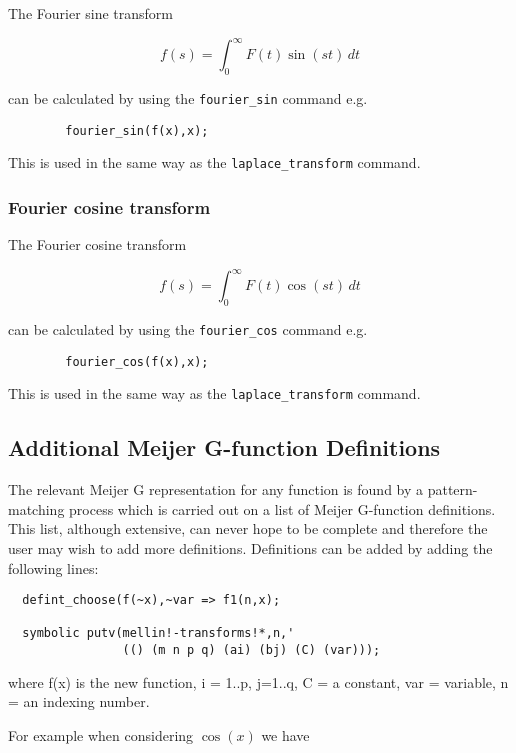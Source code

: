 The Fourier sine transform

\[
f(s) = \int_{0}^{\infty} F(t) \sin(st) \,dt
\]

can be calculated by using the \verb+fourier_sin+ command e.g.
\begin{verbatim}
        fourier_sin(f(x),x);
\end{verbatim}

This is used in the same way as the \verb+laplace_transform+ command.

\subsubsection{Fourier cosine transform}
\hypertarget{operator:FOURIER_COS}{}

The Fourier cosine transform

\[
f(s) = \int_{0}^{\infty} F(t) \cos(st) \,dt
\]

can be calculated by using the \verb+fourier_cos+ command e.g.
\begin{verbatim}
        fourier_cos(f(x),x);
\end{verbatim}

This is used in the same way as the \verb+laplace_transform+ command.

\subsection{Additional Meijer G-function Definitions}

The relevant Meijer G representation for any function is found by a
pattern-matching process which is carried out on a list of Meijer
G-function definitions. This list, although extensive, can never hope
to be complete and therefore the user may wish to add more definitions.
Definitions can be added by adding the following lines:

\begin{verbatim}
  defint_choose(f(~x),~var => f1(n,x);

  symbolic putv(mellin!-transforms!*,n,'
                (() (m n p q) (ai) (bj) (C) (var)));

\end{verbatim} 
     where f(x) is the new function, i = 1..p, j=1..q, C = a constant,
     var = variable, n = an indexing number.

For example when considering $\cos(x)$ we have

